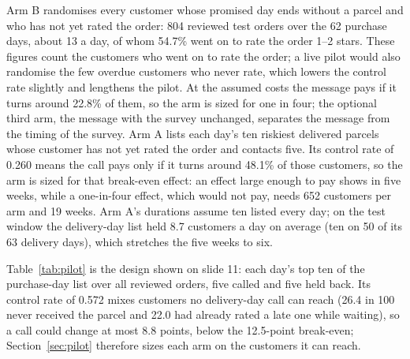 Arm B randomises every customer whose promised day ends without a parcel and
who has not yet rated the order: 804 reviewed test orders over the 62 purchase
days, about 13 a day, of whom 54.7\% went on to rate the order 1--2 stars. These
figures count the customers who went on to rate the order; a live pilot would
also randomise the few overdue customers who never rate, which lowers the
control rate slightly and lengthens the pilot. At the
assumed costs the message pays if it turns around 22.8\% of them, so the arm is
sized for one in four; the optional third arm, the message with the survey
unchanged, separates the message from the timing of the survey. Arm A lists
each day's ten riskiest delivered parcels whose customer has not yet rated the
order and contacts five. Its control rate of 0.260 means the call pays only if it
turns around 48.1\% of those customers, so the arm is sized for that break-even
effect: an effect large enough to pay shows in five weeks, while a one-in-four
effect, which would not pay, needs 652 customers per arm and 19 weeks. Arm A's
durations assume ten listed every day; on the test window the delivery-day list
held 8.7 customers a day on average (ten on 50 of its 63 delivery days), which
stretches the five weeks to six.

Table~\ref{tab:pilot} is the design shown on slide 11: each day's top ten
of the purchase-day list over all reviewed orders, five called and five held
back. Its control rate of 0.572 mixes customers no delivery-day call can reach
(26.4 in 100 never received the parcel and 22.0 had already rated a late one
while waiting), so a call could change at most 8.8 points, below the 12.5-point
break-even; Section~\ref{sec:pilot} therefore sizes each arm on the customers it
can reach.

